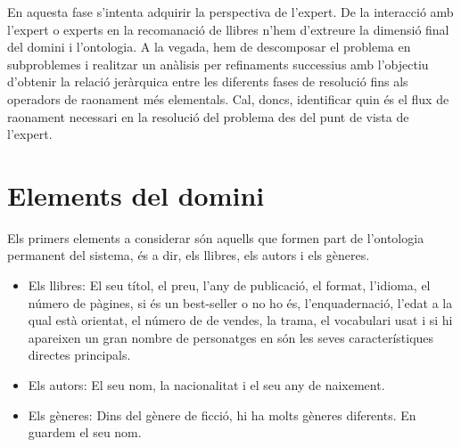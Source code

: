 
En aquesta fase s'intenta adquirir la perspectiva de l'expert. De la interacció amb l'expert o experts en la recomanació de llibres n'hem d'extreure la dimensió final del domini i l'ontologia. A  la vegada, hem de descomposar el problema en subproblemes i realitzar un anàlisis per refinaments successius amb l'objectiu d'obtenir la relació jeràrquica entre les diferents fases de resolució fins als operadors de raonament més elementals. Cal, doncs, identificar quin és el flux de raonament necessari en la resolució del problema des del punt de vista de l'expert.

\section{Elements del domini}

Els primers elements a considerar són aquells que formen part de l'ontologia permanent del sistema, és a dir, els llibres, els autors i els gèneres.
\begin{itemize}
  \item Els llibres: El seu títol, el preu, l'any de publicació, el format, l'idioma, el número de pàgines, si és un best-seller o no ho és, l'enquadernació, l'edat a la qual està orientat, el número de de vendes, la trama, el vocabulari usat i si hi apareixen un gran nombre de personatges en són les seves característiques directes principals.
  \item Els autors: El seu nom, la nacionalitat i el seu any de naixement.
  \item Els gèneres: Dins del gènere de ficció, hi ha molts gèneres diferents. En guardem el seu nom.
\end{itemize}


